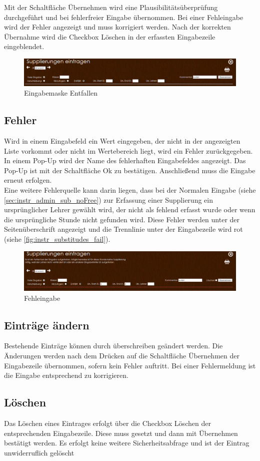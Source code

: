 Mit der Schaltfläche Übernehmen wird eine Plausibilitätsüberprüfung durchgeführt und bei fehlerfreier Eingabe übernommen. Bei einer Fehleingabe wird der Fehler angezeigt und muss korrigiert werden. Nach der korrekten Übernahme wird die Checkbox Löschen in der erfassten Eingabezeile eingeblendet.
\begin{figure}[H]
\centering
\includegraphics[keepaspectratio=true, width=17cm]{images/screenshots/substitudes_remove.png}
\caption{Eingabemaske Entfallen}
\label{fig:instr_substitudes_subRemove}
\end{figure}
\subsection{Fehler}
Wird in einem Eingabefeld ein Wert eingegeben, der nicht in der angezeigten Liste vorkommt oder nicht im Wertebereich liegt, wird ein Fehler zurückgegeben. In einem Pop-Up wird der Name des fehlerhaften Eingabefeldes angezeigt. Das Pop-Up ist mit der Schaltfläche Ok zu bestätigen. Anschließend muss die Eingabe erneut erfolgen.\\
Eine weitere Fehlerquelle kann darin liegen, dass bei der Normalen Eingabe (siehe \autoref{sec:instr_admin_sub_noFree}) zur Erfassung einer Supplierung ein ursprünglicher Lehrer gewählt wird, der nicht als fehlend erfasst wurde oder wenn die ursprüngliche Stunde nicht gefunden wird. Diese Fehler werden unter der Seitenüberschrift angezeigt und die Trennlinie unter der Eingabezeile wird rot (siehe \autoref{fig:instr_substitudes_fail}).
\begin{figure}[H]
\centering
\includegraphics[keepaspectratio=true, width=17cm]{images/screenshots/substitudes_fail.png}
\caption{Fehleingabe}
\label{fig:instr_substitudes_fail}
\end{figure}
\subsection{Einträge ändern}
Bestehende Einträge können durch überschreiben geändert werden. Die Änderungen werden nach dem Drücken auf die Schaltfläche Übernehmen der Eingabezeile übernommen, sofern kein Fehler auftritt. Bei einer Fehlermeldung ist die Eingabe entsprechend zu korrigieren.
\subsection{Löschen}
Das Löschen eines Eintrages erfolgt über die Checkbox Löschen der entsprechenden Eingabezeile. Diese muss gesetzt und dann mit Übernehmen bestätigt werden. Es erfolgt keine weitere Sicherheitsabfrage und ist der Eintrag unwiderruflich gelöscht